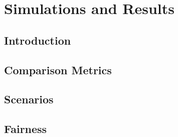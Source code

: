 \chapter{Simulations and Results}
\label{chap:scenarios} 


\section{Introduction}

\section{Comparison Metrics}

\section{Scenarios}

\section{Fairness}